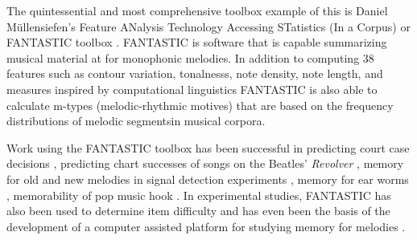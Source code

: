 \documentclass[]{book}
\begin{document}
The quintessential and most comprehensive toolbox example of this is Daniel Müllensiefen's Feature ANalysis Technology Accessing STatistics (In a Corpus) or FANTASTIC toolbox \citep{mullensiefenFantasticFeatureANalysis2009}.
FANTASTIC is software that is capable summarizing musical material at for monophonic melodies.
In addition to computing 38 features such as contour variation, tonalnesss, note density, note length, and measures inspired by computational linguistics \citep{manningFoundationsStatisticalNatural1999} FANTASTIC is also able to calculate m-types (melodic-rhythmic motives) that are based on the frequency distributions of melodic segmentsin musical corpora.

Work using the FANTASTIC toolbox has been successful in predicting court case decisions \citep{mullensiefenCourtDecisionsMusic2009}, predicting chart successes of songs on the Beatles' \emph{Revolver} \citep{kopiezAufSucheNach2011}, memory for old and new melodies in signal detection experiments \citep{mullensiefenRoleFeaturesContext2014}, memory for ear worms \citep{jakubowskiDissectingEarwormMelodic2017, williamsonEarwormsThreeAngles2012}, memorability of pop music hook \citep{balenCorpusAnalyisTools2015}.
In experimental studies, FANTASTIC has also been used to determine item difficulty \citep{bakerPerceptionLeitmotivesRichard2017, harrisonModellingMelodicDiscrimination2016} and has even been the basis of the development of a computer assisted platform for studying memory for melodies \citep{rainsfordMUSOSMUsicSOftware2018}.
\end{document}
